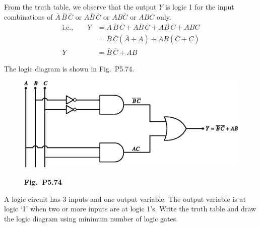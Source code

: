 \begin{solution}
From the truth table, we observe that the output $Y$ is logic 1 for the input combinations of $\overline{A}\,\overline{B}\,\overline{C}$ or $A\overline{B}\,\overline{C}$ or $AB\overline{C}$ or $ABC$ only.
\begin{align*}
\text{i.e.,}\qquad Y &= \overline{A}\,\overline{B}\,\overline{C}+A\overline{B}\,\overline{C}+AB\,\overline{C}+ABC\\[3pt]
&= \overline{B}\,\overline{C}(\overline{A}+A)+AB(\overline{C}+C)\\[3pt]
Y &= \overline{B}\,\overline{C}+AB
\end{align*}

\eject

The logic diagram is shown in Fig.~P5.74.
\begin{figure}[H]
\centering
\includegraphics{chap5/figP5.71.eps}
\smallskip

{\bf Fig.~P5.74}
\end{figure}
\end{solution}

\begin{problem}\label{prob5.75}
A logic circuit has 3 inputs and one output variable. The output variable is at logic `1' when two or more inputs are at logic 1's. Write the truth table and draw the logic diagram using minimum number of logic gates.
\end{problem}

